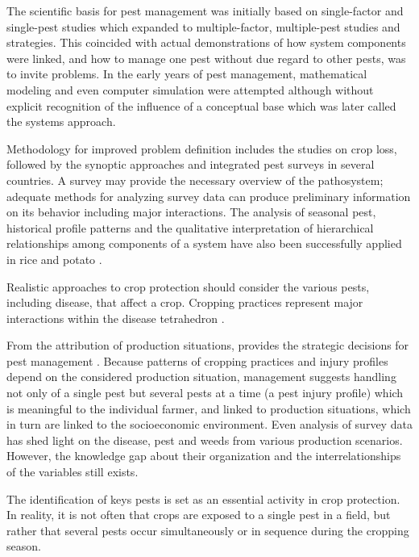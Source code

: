 The scientific basis for pest management was initially based on single-factor and single-pest studies which expanded to multiple-factor, multiple-pest studies and strategies. This coincided with actual demonstrations of how system components were linked, and how to manage one pest without due regard to other pests, was to invite problems. In the early years of pest management, mathematical modeling and even computer simulation were attempted although without explicit recognition of the influence of a conceptual base which was later called the systems approach.

Methodology for improved problem definition includes the studies on crop loss, followed by the synoptic approaches and integrated pest surveys in several countries. A survey may provide the necessary overview of the pathosystem; adequate methods for analyzing survey data can produce preliminary information on its behavior including major interactions. The analysis of seasonal pest, historical profile patterns and the qualitative interpretation of hierarchical relationships among components of a system have also been successfully applied in rice and potato \citep{teng1992implementing, heong1985systems}. 

Realistic approaches to crop protection should consider the various pests, including disease, that affect a crop. Cropping practices represent major interactions within the disease tetrahedron \cite{Zadoks:1979ts}.

From the attribution of production situations, provides the strategic decisions for pest management \cite{Mew:2004kh}. Because patterns of cropping practices and injury profiles depend on the considered production situation, management suggests handling not only of a single pest but several pests at a time (a pest injury profile) which is meaningful to the individual farmer, and linked to production situations, which in turn are linked to the socioeconomic environment. 
Even analysis of survey data has shed light on the disease, pest and weeds from various production scenarios. However, the knowledge gap about their organization and the interrelationships of the variables still exists.

The identification of keys pests is set as an essential activity in crop protection. In reality, it is not often that crops are exposed to a single pest in a field, but rather that several pests occur simultaneously or in sequence during the cropping season. 

